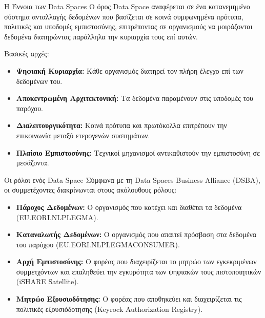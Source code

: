 \documentclass[11pt]{beamer}
\newcommand{\en}[1]{\foreignlanguage{english}{#1}}
\begin{document}
\begin{frame}{Η Έννοια των \en{Data Spaces}}
Ο όρος \textlatin{Data Space} 
αναφέρεται σε ένα κατανεμημένο σύστημα ανταλλαγής δεδομένων που βασίζεται σε κοινά συμφωνημένα πρότυπα, πολιτικές και υποδομές εμπιστοσύνης,
επιτρέποντας σε οργανισμούς να μοιράζονται δεδομένα διατηρώντας παράλληλα την κυριαρχία
τους επί αυτών.
\bigskip

Βασικές αρχές:
\begin{itemize}
    \item \textbf{Ψηφιακή Κυριαρχία:} Κάθε οργανισμός διατηρεί τον πλήρη
    έλεγχο επί των δεδομένων του.
    \item \textbf{Αποκεντρωμένη Αρχιτεκτονική:} Τα δεδομένα παραμένουν
    στις υποδομές του παρόχου.
    \item \textbf{Διαλειτουργικότητα:} Κοινά πρότυπα και πρωτόκολλα
    επιτρέπουν την επικοινωνία μεταξύ ετερογενών συστημάτων.
    \item \textbf{Πλαίσιο Εμπιστοσύνης:} Τεχνικοί μηχανισμοί αντικαθιστούν την εμπιστοσύνη σε
    μεσάζοντα.
\end{itemize}
\end{frame}

\begin{frame}{Οι ρόλοι ενός \en{Data Space}}
Σύμφωνα με τη \en{Data Spaces Business Alliance (DSBA)}, οι συμμετέχοντες 
διακρίνωνται στους ακόλουθους ρόλους:
\bigskip
\begin{itemize}
    \item \textbf{Πάροχος Δεδομένων:} Ο οργανισμός που κατέχει και διαθέτει τα δεδομένα
    (\textlatin{EU.EORI.NLPLEGMA}).
    \item \textbf{Καταναλωτής Δεδομένων:} Ο οργανισμός που απαιτεί πρόσβαση στα δεδομένα
    του παρόχου (\textlatin{EU.EORI.NLPLEGMACONSUMER}).
    \item \textbf{Αρχή Εμπιστοσύνης:} Ο φορέας που διαχειρίζεται το μητρώο των εγκεκριμένων
    συμμετχόντων και επαληθεύει την εγκυρότητα των ψηφιακών τους πιστοποιητικών
    (\textlatin{iSHARE Satellite}).
    \item \textbf{Μητρώο Εξουσιοδότησης:} Ο φορέας που αποθηκεύει και διαχειρίζεται τις
    πολιτικές εξουσιόδοτησης (\textlatin{Keyrock Authorization Registry}).
\end{itemize}
\end{frame}
\end{document}
